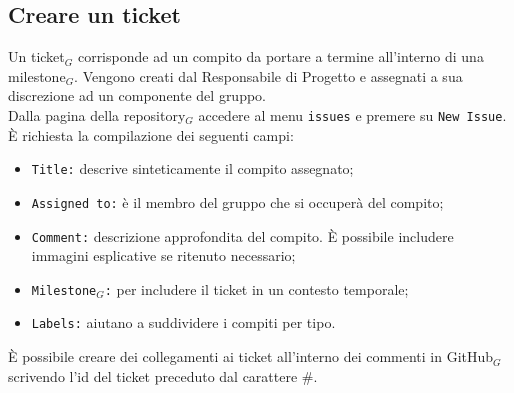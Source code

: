 \subsection{Creare un ticket}
Un ticket$_{G}$ corrisponde ad un compito da portare a termine all'interno di una milestone$_{G}$. Vengono creati dal Responsabile di Progetto e assegnati a sua discrezione ad un componente del gruppo. \\
Dalla pagina della repository$_{G}$ accedere al menu \texttt{issues} e premere su \texttt{New Issue}.\\
È richiesta la compilazione dei seguenti campi:
\begin{itemize}
    \item \texttt{Title:} descrive sinteticamente il compito assegnato;
    \item \texttt{Assigned to:} è il membro del gruppo che si occuperà del compito;
    \item \texttt{Comment:} descrizione approfondita del compito. È possibile includere immagini esplicative se ritenuto necessario;
    \item \texttt{Milestone$_{G}$:} per includere il ticket in un contesto temporale;
    \item \texttt{Labels:} aiutano a suddividere i compiti per tipo.
\end{itemize}
È possibile creare dei collegamenti ai ticket all'interno dei commenti in GitHub$_{G}$ scrivendo l'id del ticket preceduto dal carattere \#.\\

